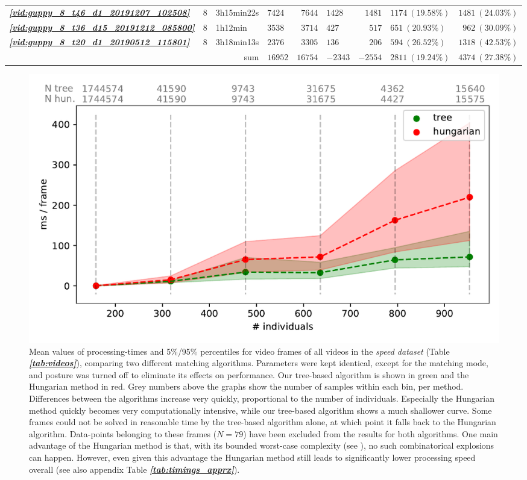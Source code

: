 \documentclass[9pt,lineno]{elife}
\newcommand{\vidref}[1]{\textit{\textbf{\ref{#1}}}}
\newcommand{\tableref}[1]{\textit{\textbf{\ref{tab:#1}}}\xspace}
\begin{document}
\begin{table}
\begin{tabular}{l l l || l r | l r | l r }
\vidref{vid:guppy_8_t46_d1_20191207_102508} & $ 8 $ &  3h15min22s  & $ 7424 $ & $ 7644 $ & $ 1428 $ & $ 1481 $ & $ 1174 \ ( 19.58 \%)$ & $ 1481 \ ( 24.03 \%)$\\
\vidref{vid:guppy_8_t36_d15_20191212_085800} & $ 8 $ &  1h12min  & $ 3538 $ & $ 3714 $ & $ 427 $ & $ 517 $ & $ 651 \ ( 20.93 \%)$ & $ 962 \ ( 30.09 \%)$\\
\vidref{vid:guppy_8_t20_d1_20190512_115801} & $ 8 $ &  3h18min13s  & $ 2376 $ & $ 3305 $ & $ 136 $ & $ 206 $ & $ 594 \ ( 26.52 \%)$ & $ 1318 \ ( 42.53 \%)$\\
\hline
\multicolumn{3}{r||}{sum} & $ 16952 $ & $ 16754 $ & $ - 2343 $ & $- 2554 $ &$ 2811 \ ( 19.24 \%)$ & $ 4374 \ ( 27.38 \%)$ \\
\bottomrule
\end{tabular}
\end{table}

\begin{figure}
\includegraphics[width=0.9\linewidth]{approx_accurate.pdf}
\caption{Mean values of processing-times and 5\%/95\% percentiles for video frames of all videos in the \textit{speed dataset} (Table \tableref{videos}), comparing two different matching algorithms. Parameters were kept identical, except for the matching mode, and posture was turned off to eliminate its effects on performance. Our tree-based algorithm is shown in green and the Hungarian method in red. Grey numbers above the graphs show the number of samples within each bin, per method. Differences between the algorithms increase very quickly, proportional to the number of individuals. Especially the Hungarian method quickly becomes very computationally intensive, while our tree-based algorithm shows a much shallower curve. Some frames could not be solved in reasonable time by the tree-based algorithm alone, at which point it falls back to the Hungarian algorithm. Data-points belonging to these frames ($N=79$) have been excluded from the results for both algorithms. One main advantage of the Hungarian method is that, with its bounded worst-case complexity (see ), no such combinatorical explosions can happen. However, even given this advantage the Hungarian method still leads to significantly lower processing speed overall (see also appendix Table \tableref{timings_apprx}).}
\label{fig:approx_accurate}
\end{figure}
\end{document}
